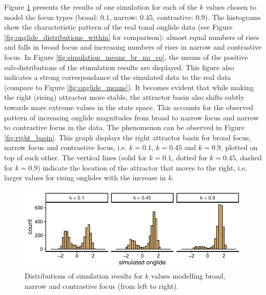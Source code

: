 Figure \ref{fig:simulation_br_na_co} presents the results of one simulation for each of the $k$ values chosen to model the focus types (broad: $0.1$, narrow: $0.45$, contrastive: $0.9$). The histograms show the characteristic pattern of the real tonal onglide data (see Figure \ref{fig:onglide_distributions_within} for comparison): almost equal numbers of rises and falls in broad focus and increasing numbers of rises in narrow and contrastive focus. In Figure \ref{fig:simulation_means_br_na_co}, the means of the positive sub-distributions of the stimulation results are displayed. This figure also indicates a strong correspondance of the simulated data to the real data (compare to Figure \ref{fig:onglide_means}).  It becomes evident that while making the right (rising) attractor more stable, the attractor basin also shifts subtly towards more extreme values in the state space. This accounts for the observed pattern of increasing onglide magnitudes from broad to narrow focus and narrow to contrastive focus in the data. The phenomenon can be observed in Figure \ref{fig:right_basin}. This graph displays the right attractor basin for broad focus, narrow focus and contrastive focus, i.e. $k=0.1$, $k=0.45$ and $k=0.9$, plotted on top of each other. The vertical lines (solid for $k=0.1$, dotted for $k=0.45$, dashed for $k=0.9$)  indicate the location of the attractor that moves to the right, i.e. larger values for rising onglides with the increase in $k$.

\begin{figure}[htbp]
\begin{center}
\includegraphics[width=\textwidth]{figures/ch6/onglide_all_within.pdf}
\caption[Distributions of simulation results for $k$ values modelling broad ($k=0.1$), narrow ($k=0.45$) and contrastive focus ($k=0.9$).]{Distributions of simulation results for $k$ values modelling broad, narrow and contrastive focus (from left to right).}
\label{fig:simulation_br_na_co}
\end{center}
\end{figure}

